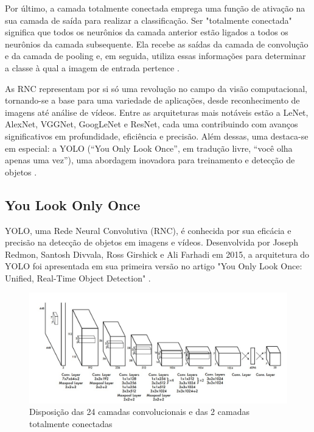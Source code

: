 Por último, a camada totalmente conectada emprega uma função de ativação na sua camada de saída para realizar a classificação. Ser "totalmente conectada" significa que todos os neurônios da camada anterior estão ligados a todos os neurônios da camada subsequente. Ela recebe as saídas da camada de convolução e da camada de pooling e, em seguida, utiliza essas informações para determinar a classe à qual a imagem de entrada pertence \cite{silva2018estudo}.

As RNC representam por si só uma revolução no campo da visão computacional, tornando-se a base para uma variedade de aplicações, desde reconhecimento de imagens até análise de vídeos. Entre as arquiteturas mais notáveis estão a LeNet, AlexNet, VGGNet, GoogLeNet e ResNet, cada uma contribuindo com avanços significativos em profundidade, eficiência e precisão. Além dessas, uma destaca-se em especial: a YOLO (“You Only Look Once”, em tradução livre, “você olha apenas uma vez”), uma abordagem inovadora para treinamento e detecção de objetos \cite{carboni2021sistema}.

\subsection{You Look Only Once}
\label{sec:yolo}

YOLO, uma Rede Neural Convolutiva (RNC), é conhecida por sua eficácia e precisão na detecção de objetos em imagens e vídeos. Desenvolvida por Joseph Redmon, Santosh Divvala, Ross Girshick e Ali Farhadi em 2015, a arquitetura do YOLO foi apresentada em sua primeira versão no artigo "You Only Look Once: Unified, Real-Time Object Detection" \cite{redmon2016youlookonce}.
\begin{figure}[!h]
    \center
    \begin{minipage}{0.9\linewidth}
    \center
    \captionsetup{justification=centering,margin=0.5cm,font=small}
    \includegraphics[width=0.7\linewidth]{img/cap2/RNC-YOLO.jpeg}
    \caption{ Disposição das 24 camadas convolucionais e das 2 camadas totalmente conectadas \cite{redmon2016youlookonce}} \label{fig:rnc-yolo}
    \end{minipage}
\end{figure}

